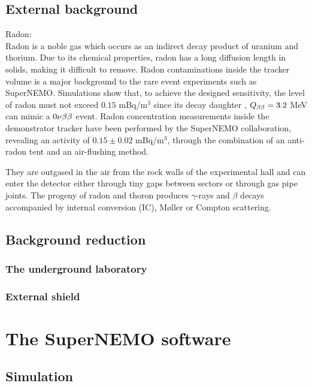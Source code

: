 \subsection{External background}
\label{subsec:SNexternal_bkg}

Radon:\\
Radon is a noble gas which occurs as an indirect decay product of uranium and thorium.
Due to its chemical properties, radon has a long diffusion length in solids, making it difficult to remove.
Radon contaminations inside the tracker volume is a major background to the rare event experiments such as SuperNEMO.
Simulations show that, to achieve the designed sensitivity, the level of radon must not exceed $0.15$ mBq/m$^{3}$ since its decay daughter \Bi, $Q_{\beta\beta}= 3.2$ MeV can mimic a $0\nu\beta\beta$ event.
Radon concentration measurements inside the demonstrator tracker have been performed by the SuperNEMO collaboration, revealing an activity of $0.15\pm0.02$ mBq/m$^{3}$, through the combination of an anti-radon tent and an air-flushing method.

They are outgased in the air from the rock walls of the experimental hall and can enter the detector either through tiny gaps between sectors or through gas pipe joints.
The progeny of radon and thoron produces $\gamma$-rays and $\beta$ decays accompanied by internal conversion (IC), Møller or Compton scattering.


\subsection{Background reduction}

\subsubsection{The underground laboratory}

\subsubsection{External shield}


\section{The SuperNEMO software}
\label{sec:SNsoftware}
\subsection{Simulation}

